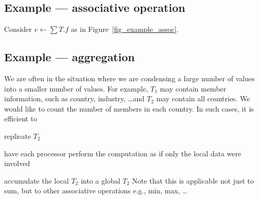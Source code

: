 \subsection{Example --- associative operation}
\label{eg_assoc}
Consider \(v \leftarrow \sum T.f\) as in Figure~\ref{fig_example_assoc}.

\begin{figure}[hb]
\begin{center}
\end{center}
\end{figure}

\subsection{Example --- aggregation}
\label{eg_agg}
We are often in the situation where we are condensing a large number of
values into a smaller number of values. For example, \(T_1\) may contain
member information, such as country, industry, \ldots and \(T_2\) may
contain all countries. We would like to count the number of members in
each country. In such cases, it is efficient to 
\be
\item replicate \(T_2\)
\item have each processor perform the computation as if only the local data
were involved 
\item accumulate the local \(T_2\) into a global \(T_2\)
\ee
Note that this is applicable not just to sum, but to other associative
operations e.g., min, max, \ldots

